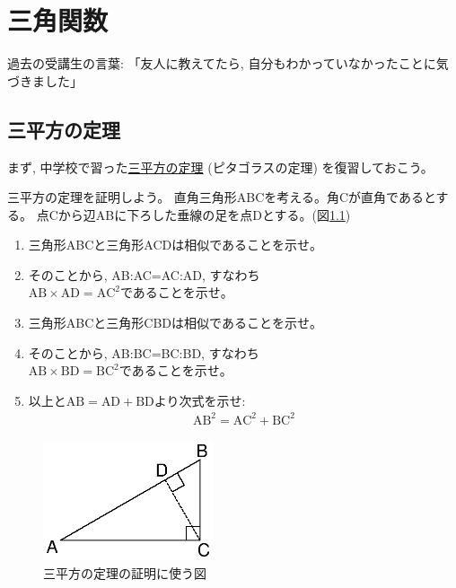 \chapter{三角関数}

{\small 過去の受講生の言葉: 「友人に教えてたら, 自分もわかっていなかったことに気づきました」}

\section{三平方の定理}

まず, 中学校で習った\underline{三平方の定理}
 (ピタゴラスの定理)
を復習しておこう。\mv

\begin{q}\label{q:trig_Pitag} 三平方の定理を証明しよう。
直角三角形ABCを考える。角Cが直角であるとする。
点Cから辺ABに下ろした垂線の足を点Dとする。(図\ref{fig:Pitag})
\begin{enumerate}
\item 三角形ABCと三角形ACDは相似であることを示せ。
\item そのことから, AB:AC=AC:AD, すなわち\\
$\text{AB}\times \text{AD}=\text{AC}^2$であることを示せ。
\item 三角形ABCと三角形CBDは相似であることを示せ。
\item そのことから, AB:BC=BC:BD, すなわち\\
$\text{AB}\times \text{BD}=\text{BC}^2$であることを示せ。
\item 以上と$\text{AB}=\text{AD}+\text{BD}$より次式を示せ:
\begin{eqnarray}
\text{AB}^2=\text{AC}^2+\text{BC}^2\label{eq:pitagorus_0}
\end{eqnarray}
\end{enumerate}\end{q}
\begin{figure}[h]
    \centering
    \includegraphics[width=5cm]{Pitag.eps}
    \caption{三平方の定理の証明に使う図}\label{fig:Pitag}
\end{figure}
\mv


